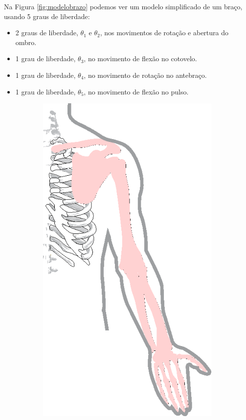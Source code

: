 Na Figura \ref{fig:modelobrazo} podemos ver um modelo simplificado de um braço,
usando 5 graus de liberdade:
\begin{itemize}
\item 2 graus de liberdade, $\theta_1$ e $\theta_2$, nos movimentos de rotação e abertura do ombro.
\item 1 grau de liberdade, $\theta_3$, no movimento de flexão no cotovelo.
\item 1 grau de liberdade, $\theta_4$, no movimento de rotação no antebraço.
\item 1 grau de liberdade, $\theta_5$, no movimento de flexão no pulso.
\end{itemize}

 

\begin{figure}[!ht]
     \centering
     \begin{subfigure}[b]{0.31\textwidth}
         \centering
         \includegraphics[width=\textwidth]{chapters/cap-normas/brazo1.eps}

\end{subfigure}
\end{figure}

